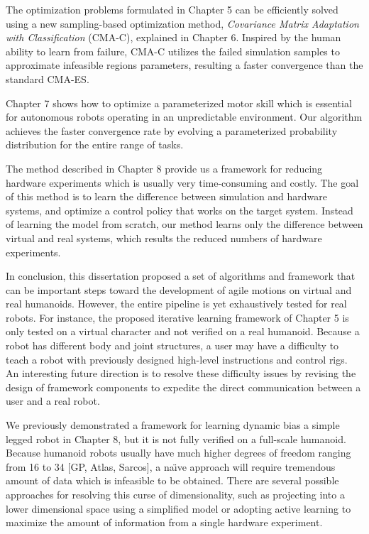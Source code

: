 The optimization problems formulated in Chapter 5 can be efficiently solved
using a new sampling-based optimization method, \emph{Covariance Matrix
Adaptation with Classification} (CMA-C), explained in Chapter 6.
Inspired by the human ability to learn from failure,
CMA-C utilizes the failed simulation samples to approximate infeasible regions
parameters, resulting a faster convergence than the standard CMA-ES.

Chapter 7 shows how to optimize a parameterized motor skill which
is essential for autonomous robots operating in an unpredictable environment.
Our algorithm achieves the faster convergence rate by evolving a parameterized
probability distribution for the entire range of tasks.

The method described in Chapter 8 provide us a framework for reducing hardware
experiments which is usually very time-consuming and costly.
The goal of this method is to learn the difference between simulation and
hardware systems, and optimize a control policy that works on the target system.
Instead of learning the model from scratch, our method learns only the
difference between virtual and real systems, which results the reduced
numbers of hardware experiments.

In conclusion, this dissertation proposed a set of algorithms and framework
that can be important steps toward the development of agile motions on virtual
and real humanoids.
However, the entire pipeline is yet exhaustively tested for real robots.
For instance, the proposed iterative learning framework of Chapter 5 is only
tested on a virtual character and not verified on a real humanoid.
Because a robot has different body and joint structures,
a user may have a difficulty to teach a robot with previously
designed high-level instructions and control rigs.
An interesting future direction is to resolve these difficulty issues by 
revising the design of framework components to expedite the direct 
communication between a user and a real robot.

We previously demonstrated a framework for learning dynamic bias
a simple legged robot in Chapter 8, but it is not fully verified on a
full-scale humanoid.
Because humanoid robots usually have much higher degrees of freedom ranging
from 16 to 34 [GP, Atlas, Sarcos], a na\"{\i}ve approach will require
tremendous amount of data which is infeasible to be obtained.
There are several possible approaches for resolving this curse of
dimensionality, such as projecting into a lower dimensional space using a
simplified model or adopting active learning to maximize the amount of
information from a single hardware experiment.












